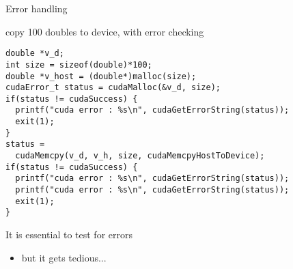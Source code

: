 \begin{frame}[fragile]{Error handling}

    \begin{code}{copy 100 doubles to device, with error checking}
        \begin{lstlisting}[style=boxcuda]
double *v_d;
int size = sizeof(double)*100;
double *v_host = (double*)malloc(size);
cudaError_t status = cudaMalloc(&v_d, size);
if(status != cudaSuccess) {
  printf("cuda error : %s\n", cudaGetErrorString(status));
  exit(1);
}
status =
  cudaMemcpy(v_d, v_h, size, cudaMemcpyHostToDevice);
if(status != cudaSuccess) {
  printf("cuda error : %s\n", cudaGetErrorString(status));
  printf("cuda error : %s\n", cudaGetErrorString(status));
  exit(1);
}
        \end{lstlisting}
    \end{code}

    It is essential to test for errors
    \begin{itemize}
        \item but it gets tedious...
    \end{itemize}
\end{frame}

